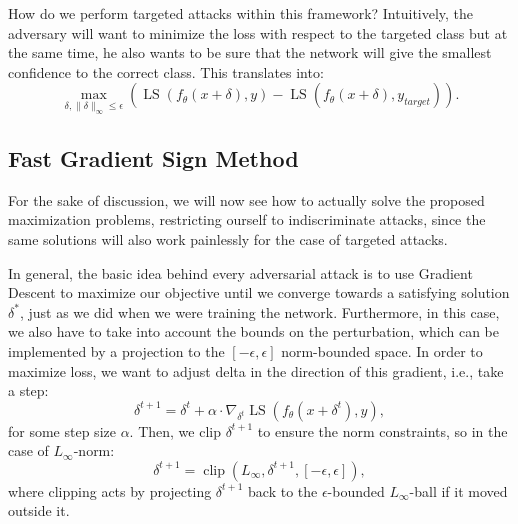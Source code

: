 \documentclass[LaM,binding=0.6cm]{./packages/sapthesis/sapthesis}
\begin{document}
        How do we perform targeted attacks within this framework? Intuitively, the adversary will want to minimize the loss with respect to the targeted class but at the same time, he also wants 
        to be sure that the network will give the smallest confidence to the correct class. This translates into:
        \begin{equation}
            \label{targetedattack}
            \displaystyle{\max_{\delta, \|\delta\|_{\infty} \leq \epsilon }  (\operatorname{LS}(f_{\theta}(x + \delta), y) - \operatorname{LS}(f_{\theta}(x + \delta), y_{target}) )  }.
        \end{equation} 

    \subsection{Fast Gradient Sign Method}
        \label{fgsm}

        For the sake of discussion, we will now see how to actually solve the proposed maximization problems, restricting ourself to indiscriminate attacks, since the same solutions will also
        work painlessly for the case of targeted attacks. 

        In general, the basic idea behind every adversarial attack is to use Gradient Descent to maximize our objective until we converge towards a satisfying solution $\delta^{*}$,
        just as we did when we were training the network. Furthermore, in this case, we also have to take into account the bounds on the perturbation, which can be implemented by a projection  
        to the $[-\epsilon, \epsilon]$ norm-bounded space. In order to maximize loss, we want to adjust delta in the direction of this gradient, i.e., take a step:
        \begin{equation}
            \label{pgd}
            \delta^{t+1} = \delta^t + \alpha \cdot \nabla_{\delta^t} \operatorname{LS}\left(f_{\theta}(x+\delta^t), y\right),
        \end{equation}
        for some step size $\alpha$. Then, we clip $\delta^{t+1}$ to ensure the norm constraints, so in the case of $L_{\infty}$-norm:
        \begin{equation}
            \delta^{t+1} = \operatorname{clip} (L_{\infty}, \delta^{t+1}, [-\epsilon, \epsilon]),
        \end{equation}
        where clipping acts by projecting $\delta^{t+1}$ back to the $\epsilon$-bounded $L_{\infty}$-ball if it moved outside it.
\end{document}

